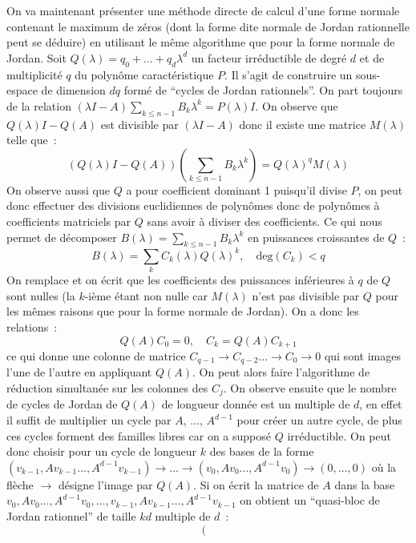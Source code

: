 \documentclass[a4paper,11pt]{book}
\begin{document}
\begin{giacjshere}
On va maintenant pr\'esenter une m\'ethode directe de calcul d'une forme normale
contenant le maximum de z\'eros (dont la forme dite normale de Jordan
rationnelle peut se d\'eduire) en utilisant le m\^eme algorithme que pour 
la forme
normale de Jordan. Soit $Q(\lambda)=q_0+...+q_d \lambda^d$ 
un facteur irr\'eductible
de degr\'e $d$ et de multiplicit\'e $q$ 
du polyn\^ome caract\'eristique $P$. Il
s'agit de construire un sous-espace de dimension $dq$ form\'e de ``cycles
de Jordan rationnels''.
On part toujours de la relation 
$(\lambda I -A) \sum_{k\leq n-1} B_k \lambda^k=P(\lambda)I$.
On observe que $Q(\lambda)I-Q(A)$ est divisible par $(\lambda I -A) $
donc il existe une matrice $M(\lambda)$ telle que~:
\[ (Q(\lambda) I -Q(A)) (\sum_{k\leq n-1} B_k \lambda^k)
=Q(\lambda)^q M(\lambda) \]
On observe aussi que $Q$ a pour coefficient dominant 1 puisqu'il divise
$P$, on peut donc effectuer des divisions euclidiennes de polyn\^omes
donc de polyn\^omes \`a coefficients matriciels par $Q$ sans avoir
\`a diviser des coefficients. Ce qui nous
permet de d\'ecomposer $B(\lambda)=\sum_{k\leq n-1} B_k \lambda^k$ en 
puissances croissantes de $Q$~:
\[ B(\lambda)=\sum_k C_k(\lambda) Q(\lambda)^k, \quad \mbox{deg}(C_k)<q \]
On remplace et on \'ecrit que les coefficients des puissances inf\'erieures
\`a $q$ de $Q$ sont nulles (la $k$-i\`eme \'etant non nulle
car $M(\lambda)$ n'est pas divisible par $Q$ pour les m\^emes raisons
que pour la forme normale de Jordan). On a donc les relations~:
\[ Q(A)C_0 = 0, \quad C_k = Q(A) C_{k+1} \]
ce qui donne une colonne de matrice 
$C_{q-1} \rightarrow C_{q-2} ... \rightarrow C_0 \rightarrow 0$
qui sont images l'une de l'autre en appliquant $Q(A)$. On peut alors
faire l'algorithme de r\'eduction simultan\'ee sur les colonnes des $C_j$. 
On observe
ensuite que le nombre de cycles de Jordan de $Q(A)$ de longueur donn\'ee 
est un multiple de $d$, en effet il suffit de multiplier
un cycle par $A$, ..., $A^{d-1}$ pour cr\'eer un autre cycle, de plus ces
cycles forment des familles libres car on a suppos\'e $Q$ irr\'eductible.
On peut donc choisir pour un cycle de longueur $k$ des bases de la forme
$(v_{k-1},Av_{k-1}...,A^{d-1}v_{k-1}) \rightarrow ... 
\rightarrow (v_{0},Av_{0}...,A^{d-1}v_{0}) \rightarrow (0,...,0) $
o\`u la fl\`eche $\rightarrow$ d\'esigne l'image par $Q(A)$.
Si on \'ecrit la matrice de $A$ dans la base 
$v_{0},Av_{0}...,A^{d-1}v_{0},...,v_{k-1},Av_{k-1}...,A^{d-1}v_{k-1}$
on obtient un ``quasi-bloc de Jordan rationnel'' de taille $kd$ 
multiple de $d$~:
\[ 
\left( \begin{array}{cccccccccc}

\end{array}\]
\end{giacjshere}
\end{document}
